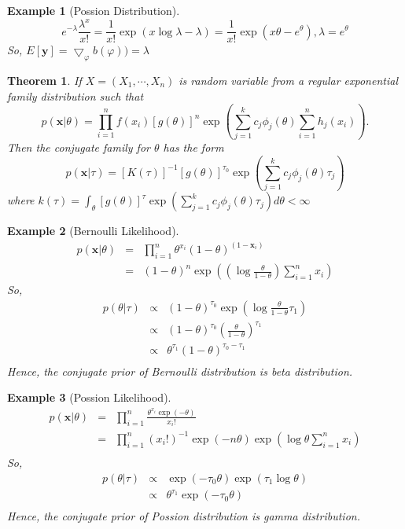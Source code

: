 \documentclass[11pt]{article}
\def\x{{\bm x}}
\def\y{{\bm y}}
\newtheorem{theorem}{Theorem}[section]
\newtheorem{example}{Example}[section]
\begin{document}
\begin{example}[Possion Distribution]
$$
e^{-\lambda}\frac{\lambda^x}{x!} = \frac{1}{x!}\exp(x\log \lambda-\lambda) = \frac{1}{x!}\exp(x\theta-e^\theta), \lambda = e^\theta
$$
So, $E[\y] = \bigtriangledown_{\varphi}b(\varphi)) = \lambda$
\end{example}
\begin{theorem}
If $X=(X_1, \cdots, X_n)$ is random variable from a regular exponential family distribution such that
$$
p(\x|\theta) = \prod_{i=1}^{n}f(x_i)[g(\theta)]^n\exp\left(\sum_{j=1}^{k}c_j\phi_j(\theta)\sum_{i=1}^{n}h_j(x_i)\right).
$$
Then the conjugate family for $\theta$ has the form
$$
p(\x|\tau) = [K(\tau)]^{-1}[g(\theta)]^{\tau_0}\exp\left(\sum_{j=1}^{k}c_j\phi_j(\theta)\tau_j\right)
$$
where $k(\tau) = \int_\theta [g(\theta)]^\tau \exp\left(\sum_{j=1}^{k}c_j\phi_j(\theta)\tau_j\right) d\theta < \infty$
\end{theorem}
\begin{example}[Bernoulli Likelihood]
\begin{eqnarray*}
p(\x|\theta) &=& \prod_{i=1}^{n}\theta^{x_i}(1-\theta)^{(1-\x_i)} \\
&=&(1-\theta)^n\exp\left((\log \frac{\theta}{1-\theta})\sum_{i=1}^{n}x_i\right)
\end{eqnarray*}
So,
\begin{eqnarray*}
p(\theta|\tau) &\propto& (1-\theta)^{\tau_0}\exp\left(\log\frac{\theta}{1-\theta}\tau_1\right) \\
&\propto& (1-\theta)^{\tau_0}\left(\frac{\theta}{1-\theta}\right)^{\tau_1} \\
&\propto& \theta^{\tau_1}(1-\theta)^{\tau_0-\tau_1}\\
\end{eqnarray*}
Hence, the conjugate prior of Bernoulli distribution is beta distribution.
\end{example}
\begin{example}[Possion Likelihood]
\begin{eqnarray*}
p(\x|\theta) &=& \prod_{i=1}^{n}\frac{\theta^{x_i}\exp(-\theta)}{x_i !} \\
&=& \prod_{i=1}^{n}(x_i!)^{-1}\exp(-n\theta)\exp(\log\theta\sum_{i=1}^n x_i) \\
\end{eqnarray*}
So, 
\begin{eqnarray*}
p(\theta|\tau) &\propto& \exp(-\tau_0\theta)\exp(\tau_1\log\theta) \\
&\propto& \theta^{\tau_1}\exp(-\tau_0\theta) \\
\end{eqnarray*}
Hence, the conjugate prior of Possion distribution is gamma distribution.
\end{example}
\end{document}
